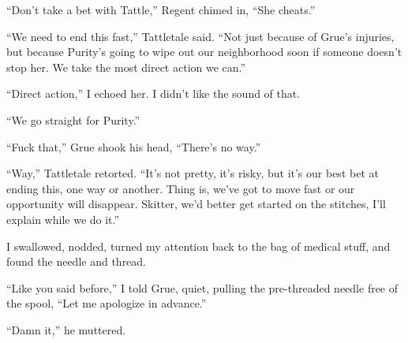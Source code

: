 ``Don't take a bet with Tattle,'' Regent chimed in, ``She cheats.''



``We need to end this fast,'' Tattletale said.  ``Not just because of Grue's injuries, but because Purity's going to wipe out our neighborhood soon if someone doesn't stop her.  We take the most direct action we can.''



``Direct action,'' I echoed her.  I didn't like the sound of that.



``We go straight for Purity.''



``Fuck that,'' Grue shook his head, ``There's no way.''



``Way,'' Tattletale retorted.  ``It's not pretty, it's risky, but it's our best bet at ending this, one way or another.  Thing is, we've got to move fast or our opportunity will disappear.  Skitter, we'd better get started on the stitches, I'll explain while we do it.''



I swallowed, nodded, turned my attention back to the bag of medical stuff, and found the needle and thread.



``Like you said before,'' I told Grue, quiet, pulling the pre-threaded needle free of the spool, ``Let me apologize in advance.''



``Damn it,'' he muttered.





